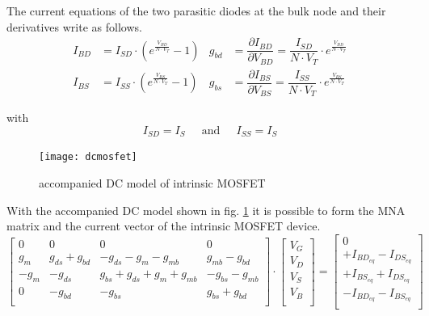 \documentclass[10pt]{report}
\begin{document}
The current equations of the two parasitic diodes at the bulk node and
their derivatives write as follows.
\begin{align}
I_{BD} &= I_{SD}\cdot \left(e^{\frac{V_{BD}}{N\cdot V_T}} - 1\right) &
g_{bd} &= \dfrac{\partial I_{BD}}{\partial V_{BD}} = \dfrac{I_{SD}}{N\cdot V_T}\cdot e^{\frac{V_{BD}}{N\cdot V_T}}\\
I_{BS} &= I_{SS}\cdot \left(e^{\frac{V_{BS}}{N\cdot V_T}} - 1\right) &
g_{bs} &= \dfrac{\partial I_{BS}}{\partial V_{BS}} = \dfrac{I_{SS}}{N\cdot V_T}\cdot e^{\frac{V_{BS}}{N\cdot V_T}}
\end{align}

with
\begin{equation}
I_{SD} = I_S
\;\;\;\; \textrm{ and } \;\;\;\;
I_{SS} = I_S
\end{equation}

\begin{figure}[ht]
\begin{center}
\texttt{[image: dcmosfet]}
\end{center}
\caption{accompanied DC model of intrinsic MOSFET}
\label{fig:dcmosfet}
\end{figure}
\FloatBarrier

With the accompanied DC model shown in fig. \ref{fig:dcmosfet} it is
possible to form the MNA matrix and the current vector of the
intrinsic MOSFET device.
\begin{equation}
\begin{bmatrix}
0 & 0 & 0 & 0\\
g_{m} & g_{ds} + g_{bd} & -g_{ds} - g_{m} -g_{mb} & g_{mb} - g_{bd}\\
-g_{m} & -g_{ds} & g_{bs} + g_{ds} + g_{m} + g_{mb} & -g_{bs} - g_{mb}\\
0 & -g_{bd} & -g_{bs} & g_{bs} + g_{bd}\\
\end{bmatrix}
\cdot
\begin{bmatrix}
V_{G}\\
V_{D}\\
V_{S}\\
V_{B}\\
\end{bmatrix}
=
\begin{bmatrix}
0\\
+I_{BD_{eq}} - I_{DS_{eq}}\\
+I_{BS_{eq}} + I_{DS_{eq}}\\
-I_{BD_{eq}} - I_{BS_{eq}}\\
\end{bmatrix}
\end{equation}
\end{document}
